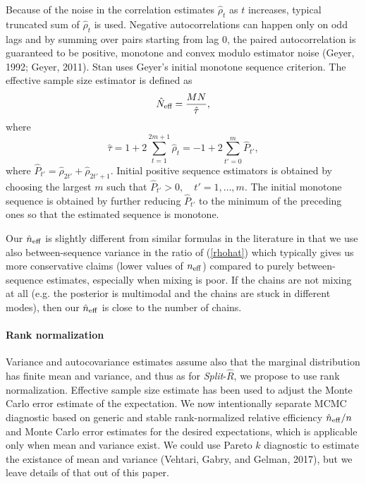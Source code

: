 \documentclass[11pt]{article}
\begin{document}
Because of the noise in the correlation estimates $\hat{\rho}_t$ as
$t$ increases, typical truncated sum of $\hat{\rho}_t$ is used.
Negative autocorrelations can happen only on odd lags and by summing
over pairs starting from lag 0, the paired autocorrelation is
guaranteed to be positive, monotone and convex modulo estimator noise
(Geyer, 1992; Geyer, 2011).  Stan uses Geyer's initial monotone
sequence criterion. The effective sample size estimator is defined as
\begin{equation}
\hat{N}_{\mbox{\scriptsize eff}}
=
\frac{MN}
     {\hat{\tau}},
\end{equation}
%
where
\begin{equation}
\hat{\tau} = 1 + 2 \sum_{t=1}^{2m+1} \hat{\rho}_t = -1 + 2 \sum_{t'=0}^{m} \hat{P}_{t'},
\end{equation}
where $\hat{P}_{t'}=\hat{\rho}_{2t'}+\hat{\rho}_{2t'+1}$. Initial
positive sequence estimators is obtained by choosing the largest $m$
such that $\hat{P}_{t'}>0, \quad t' = 1,\ldots,m$. The initial monotone
sequence is obtained by further reducing $\hat{P}_{t'}$ to the minimum
of the preceding ones so that the estimated sequence is monotone.


Our $\hat{n}_{\rm eff}$ is slightly different from similar formulas in the literature in that we use also between-sequence variance in the ratio of (\ref{rhohat}) which typically gives us more conservative claims (lower values of $n_{\rm eff}$) compared to purely between-sequence estimates, especially when mixing is poor. If the chains are not mixing at all (e.g. the posterior is multimodal and the chains are stuck in different modes), then our $\hat{n}_{\rm eff}$ is close to the number of chains.

\paragraph{Rank normalization}

Variance and autocovariance estimates assume also that the marginal
distribution has finite mean and variance, and thus as for {\em
  Split}-$\widehat{R}$, we propose to use rank
normalization. Effective sample size estimate has been used to adjust
the Monte Carlo error estimate of the expectation. We now
intentionally separate MCMC diagnostic based on generic and stable
rank-normalized relative efficiency $\hat{n}_{\rm eff}/n$ and Monte
Carlo error estimates for the desired expectations, which is
applicable only when mean and variance exist. We could use Pareto $k$
diagnostic to estimate the existance of mean and variance (Vehtari,
Gabry, and Gelman, 2017), but we leave details of that out of this
paper.
\end{document}
